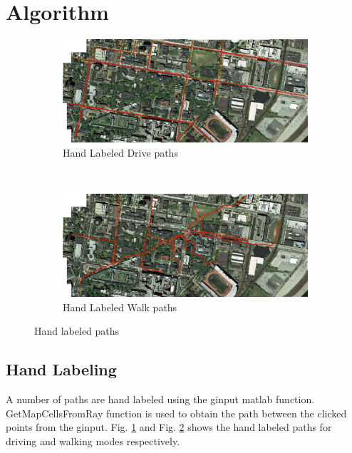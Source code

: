 \documentclass[fleqn,10pt]{SelfArx} %
\begin{document}
\section{Algorithm}
\label{sec:algo}
\begin{figure}
    \centering
    \begin{subfigure}[t]{0.5\textwidth}
        \centering
        \includegraphics[scale = 0.3]{ex_car.jpg}
        \caption{Hand Labeled Drive paths}
        \label{fig:ex_car}
    \end{subfigure}%
    ~ 
    \begin{subfigure}[t]{0.5\textwidth}
        \centering
        \includegraphics[scale = 0.3]{ex_walk.jpg}
        \caption{Hand Labeled Walk paths}
        \label{fig:ex_walk}
    \end{subfigure}
    \caption{Hand labeled paths}
    \label{fig:gr}
\end{figure}

\subsection{Hand Labeling}
A number of paths are hand labeled using the ginput matlab function. GetMapCellsFromRay function is used to obtain the path between the clicked points from the ginput. Fig. \ref{fig:ex_car} and Fig. \ref{fig:ex_walk} shows the hand labeled paths for driving and walking modes respectively.
\end{document}
